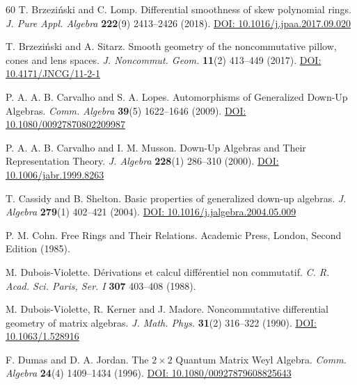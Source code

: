 \documentclass{amsart}
\theoremstyle{definition}
\theoremstyle{remark}
\numberwithin{equation}{section}
\begin{document}
\begin{thebibliography}{60}
 T. Brzezi{\'n}ski and C. Lomp. Differential smoothness of skew polynomial rings. {\em J. Pure Appl. Algebra} {\bf 222}(9) 2413--2426 (2018). \href{https://doi.org/10.1016/j.jpaa.2017.09.020}{DOI: 10.1016/j.jpaa.2017.09.020}

T. Brzezi{\'n}ski and A. Sitarz. Smooth geometry of the noncommutative pillow, cones and lens spaces. {\em J. Noncommut. Geom.} {\bf 11}(2) 413--449 (2017). \href{https://doi.org/10.4171/JNCG/11-2-1}{DOI: 10.4171/JNCG/11-2-1}

 P. A. A. B. Carvalho and S. A. Lopes. Automorphisms of Generalized Down-Up Algebras. {\em Comm. Algebra} {\bf 39}(5) 1622--1646 (2009). \href{https://www.tandfonline.com/doi/abs/10.1080/00927870802209987}{DOI: 10.1080/00927870802209987}

 P. A. A. B. Carvalho and I. M. Musson. Down-Up Algebras and Their Representation Theory. {\em J. Algebra} {\bf 228}(1) 286--310 (2000). \href{https://doi.org/10.1006/jabr.1999.8263}{DOI: 10.1006/jabr.1999.8263}


 T. Cassidy and B. Shelton. Basic properties of generalized down-up algebras. {\em J. Algebra} {\bf 279}(1) 402--421 (2004). \href{https://doi.org/10.1016/j.jalgebra.2004.05.009}{DOI: 10.1016/j.jalgebra.2004.05.009}

 P. M. Cohn. Free Rings and Their Relations. Academic Press, London, Second Edition (1985). 

 M. Dubois-Violette. D\'erivations et calcul diff\'erentiel non commutatif. {\em C. R. Acad. Sci. Paris, Ser. I} {\bf 307} 403--408 (1988).

 M. Dubois-Violette, R. Kerner and J. Madore. Noncommutative differential geometry of matrix algebras. {\em J. Math. Phys.} {\bf 31}(2) 316--322 (1990). \href{https://doi.org/10.1063/1.528916}{DOI: 10.1063/1.528916}

 F. Dumas and D. A. Jordan. The $2\times 2$ Quantum Matrix Weyl Algebra. {\em Comm. Algebra} {\bf 24}(4) 1409--1434 (1996). \href{https://doi.org/10.1080/00927879608825643}{DOI: 10.1080/00927879608825643}
 

\end{thebibliography}
\end{document}
